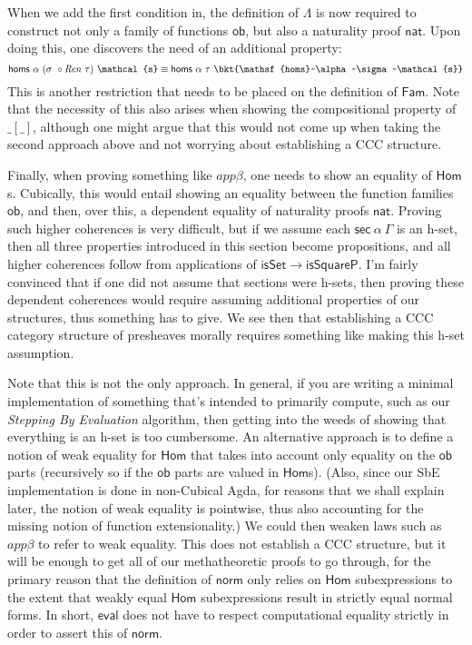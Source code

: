 When we add the first condition in, the definition of $\Lambda$ is now required
to construct not only a family of functions $\mathsf{ob}$, but also a
naturality proof $\mathsf{nat}$. Upon doing this, one discovers the need of
an additional property:
\[\mathsf{homs}~\alpha~(\sigma~\circ\mathit{Ren}~\tau)~\mathcal{s} \equiv
\mathsf{homs}~\alpha~\tau~\bkt{\mathsf{homs}~\alpha~\sigma~\mathcal{s}}\]
This is another restriction that needs to be placed on the definition of
$\mathsf{Fam}$. Note that the necessity of this also arises when showing the
compositional property of $\mathsf{\_[\_]}$, although one might argue that
this would not come up when taking the second approach above and not worrying
about establishing a CCC structure.

Finally, when proving something like $\mathit{app}\beta$, one needs to show an
equality of $\mathsf{Hom}$s. Cubically, this would entail showing an equality
between the function families $\mathsf{ob}$, and then, over this, a dependent
equality of naturality proofs $\mathsf{nat}$. Proving such higher coherences is
very difficult, but if we assume each $\mathsf{sec}~\alpha~\Gamma$ is an h-set,
then all three properties introduced in this section become propositions, and
all higher coherences follow from applications of $\mathsf{isSet\!\to \!
isSquareP}$. I'm fairly convinced that if one did not assume that sections
were h-sets, then proving these dependent coherences would require assuming
additional properties of our structures, thus something has to give. We see
then that establishing a CCC category structure of presheaves morally requires
something like making this h-set assumption.

Note that this is not the only approach. In general, if you are writing a
minimal implementation of something that's intended to primarily compute, such
as our \emph{Stepping By Evaluation} algorithm, then getting into the weeds of
showing that everything is an h-set is too cumbersome. An alternative approach
is to define a notion of weak equality for $\mathsf{Hom}$ that takes into
account only equality on the $\mathsf{ob}$ parts (recursively so if the
$\mathsf{ob}$ parts are valued in $\mathsf{Hom}$s). (Also, since our SbE
implementation is done in non-Cubical Agda, for reasons that we shall explain
later, the notion of weak equality is pointwise, thus also accounting for the
missing notion of function extensionality.) We could then weaken laws such as
$\mathit{app}\beta$ to refer to weak equality.  This does not establish a CCC
structure, but it will be enough to get all of our methatheoretic proofs to go
through, for the primary reason that the definition of $\mathsf{norm}$ only
relies on $\mathsf{Hom}$ subexpressions to the extent that weakly equal
$\mathsf{Hom}$ subexpressions result in strictly equal normal forms. In short,
$\mathsf{eval}$ does not have to respect computational equality strictly in
order to assert this of $\mathsf{norm}$.



